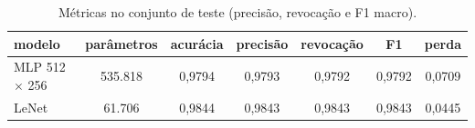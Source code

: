 \begin{table}[!t]
\centering
\caption{Métricas no conjunto de teste (precisão, revocação e F1 macro).}
\label{tab:metricas}
\begin{tabular}{lcccccc}
\hline
modelo & parâmetros & acurácia & precisão & revocação & F1 & perda \\
\hline
MLP 512 $\times$ 256 & 535.818 & 0,9794 & 0,9793 & 0,9792 & 0,9792 & 0,0709 \\
LeNet & 61.706 & 0,9844 & 0,9843 & 0,9843 & 0,9843 & 0,0445 \\
\hline
\end{tabular}
\end{table}